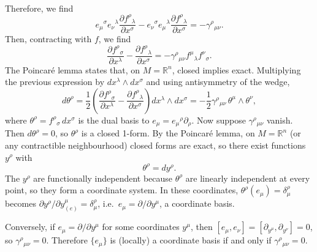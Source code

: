 \begin{solution}
\begin{equation}
\begin{aligned}
    \end{aligned}
    \end{equation}
    Therefore, we find
    \begin{equation}
        e_\mu{}^\sigma e_\nu{}^\lambda\frac{\partial f^\rho{}_\lambda}{\partial x^\sigma} - e_\nu{}^\sigma e_\mu{}^\lambda\frac{\partial f^\rho{}_\lambda}{\partial x^\sigma} = -\gamma^\rho{}_{\mu\nu}.
    \end{equation}
    Then, contracting with $f$, we find
    \begin{equation}
        \frac{\partial f^\rho{}_\sigma}{\partial x^\lambda} - \frac{\partial f^\rho{}_\lambda}{\partial x^\sigma} = -\gamma^\rho{}_{\mu\nu}f^\mu{}_\lambda f^\nu{}_\sigma.
    \end{equation}
    The Poincaré lemma states that, on $M = \mathbb{R}^n$, closed implies exact. Multiplying the previous expression by $dx^\lambda \wedge dx^\sigma$ and using antisymmetry of the wedge,
    \begin{equation}
        d\theta^\rho = \frac{1}{2}\!\left(\frac{\partial f^\rho{}_\sigma}{\partial x^\lambda} - \frac{\partial f^\rho{}_\lambda}{\partial x^\sigma}\right)dx^\lambda\wedge dx^\sigma = -\frac{1}{2}\gamma^\rho{}_{\mu\nu}\,\theta^\mu\wedge\theta^\nu,
    \end{equation}
    where $\theta^\rho = f^\rho{}_\sigma\,dx^\sigma$ is the dual basis to $e_\mu = e_\mu{}^\rho\partial_\rho$. Now suppose $\gamma^\rho{}_{\mu\nu}$ vanish. Then $d\theta^\rho = 0$, so $\theta^\rho$ is a closed 1-form. By the Poincaré lemma, on $M = \mathbb{R}^n$ (or any contractible neighbourhood) closed forms are exact, so there exist functions $y^\rho$ with
    \begin{equation}
        \theta^\rho = dy^\rho.
    \end{equation}
    The $y^\rho$ are functionally independent because $\theta^\rho$ are linearly independent at every point, so they form a coordinate system. In these coordinates, $\theta^\rho(e_\mu) = \delta^\rho_\mu$ becomes $\partial y^\rho/\partial y^\mu_{(e)} = \delta^\rho_\mu$, i.e.\ $e_\mu = \partial/\partial y^\mu$, a coordinate basis.

    Conversely, if $e_\mu = \partial/\partial y^\mu$ for some coordinates $y^\mu$, then $[e_\mu, e_\nu] = [\partial_{y^\mu}, \partial_{y^\nu}] = 0$, so $\gamma^\rho{}_{\mu\nu} = 0$. Therefore $\{e_\mu\}$ is (locally) a coordinate basis if and only if $\gamma^\rho{}_{\mu\nu} = 0$.
\end{solution}
